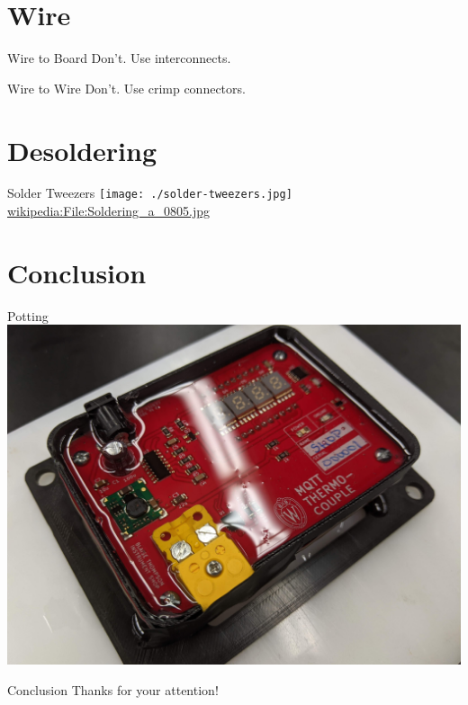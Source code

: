 \documentclass{presentation}
\begin{document}
\section{Wire}

\begin{frame}{Wire to Board}
  Don't. Use interconnects.
\end{frame}

\begin{frame}{Wire to Wire}
  Don't. Use crimp connectors.
\end{frame}

\section{Desoldering}

\begin{frame}{Solder Tweezers}
  \centering
  \texttt{[image: ./solder-tweezers.jpg]} \\
  \url{wikipedia:File:Soldering_a_0805.jpg}
\end{frame}

\section{Conclusion}

\begin{frame}{Potting}
  \centering
  \includegraphics[width=\textwidth*3/4]{./potting.jpg} \\
\end{frame}

\begin{frame}{Conclusion}
  Thanks for your attention!
\end{frame}
\end{document}
